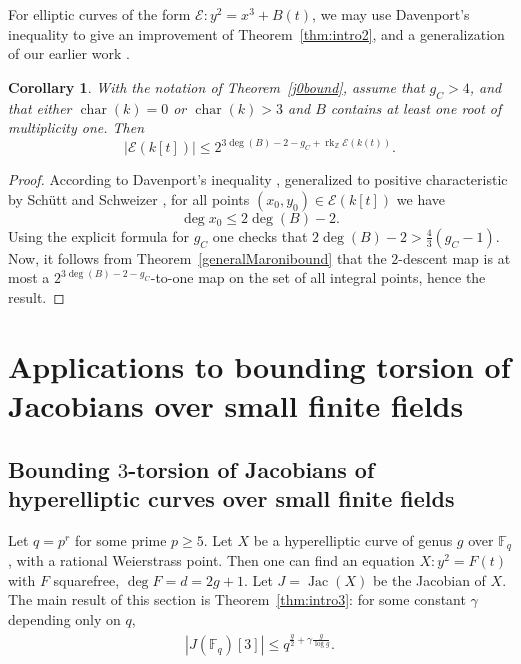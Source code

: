\documentclass[11pt]{article}
\newcommand{\Z}{\ensuremath{\mathbb{Z}}}
\theoremstyle{plain}
\newtheorem{corollary}[theorem]{Corollary}
\theoremstyle{definition}
\DeclareMathOperator{\Jac}{Jac}
\DeclareMathOperator{\rk}{rk}
\DeclareMathOperator{\car}{char}
\begin{document}
For elliptic curves of the form $\mathcal{E}:y^2=x^3+B(t)$, we may use Davenport's inequality to give an improvement of Theorem~\ref{thm:intro2}, and a generalization of our earlier work \cite{GHL23}.

\begin{corollary}
\label{thm:isotrivialcase}
With the notation of Theorem~\ref{j0bound}, assume that $g_C>4$, and that either $\car(k)=0$ or $\car(k) > 3$ and $B$ contains at least one root of multiplicity one. Then
$$
|\mathcal{E}(k[t])| \leq 2^{3\deg(B)-2-g_C+\rk_\Z \mathcal{E}(k(t))}.
$$
\end{corollary}

\begin{proof}
According to Davenport's inequality \cite{davenport65}, generalized to positive characteristic by Sch{\"u}tt and Schweizer \cite[Theorem~1.2, (b)]{SS}, for all points $(x_0,y_0) \in \mathcal{E}(k[t])$ we have
$$
\deg x_0 \leq 2\deg(B)-2.
$$
Using the explicit formula for $g_C$ one checks that $2\deg(B)-2 > \frac{4}{3}(g_C-1)$. Now, it follows from Theorem~\ref{generalMaronibound} that the $2$-descent map is at most a $2^{3\deg(B)-2-g_C}$-to-one map on the set of all integral points, hence the result.
\end{proof}




\section{Applications to bounding torsion of Jacobians over small finite fields}

\subsection{Bounding $3$-torsion of Jacobians of hyperelliptic curves over small finite fields}
\label{section4}




Let $q=p^r$ for some prime $p\geq 5$.
Let $X$ be a hyperelliptic curve of genus $g$ over $\mathbb{F}_q$, with a rational Weierstrass point. Then one can find an equation $X:y^2=F(t)$  with $F$ squarefree, $\deg F=d=2g+1$. Let $J=\Jac(X)$ be the Jacobian of $X$.
The main result of this section is Theorem~\ref{thm:intro3}: for some constant $\gamma$ depending only on $q$,
\begin{align*}
|J(\mathbb{F}_q)[3]|\leq q^{\frac{g}{2}+\gamma\frac{g}{\log g}}.
\end{align*}
\end{document}

